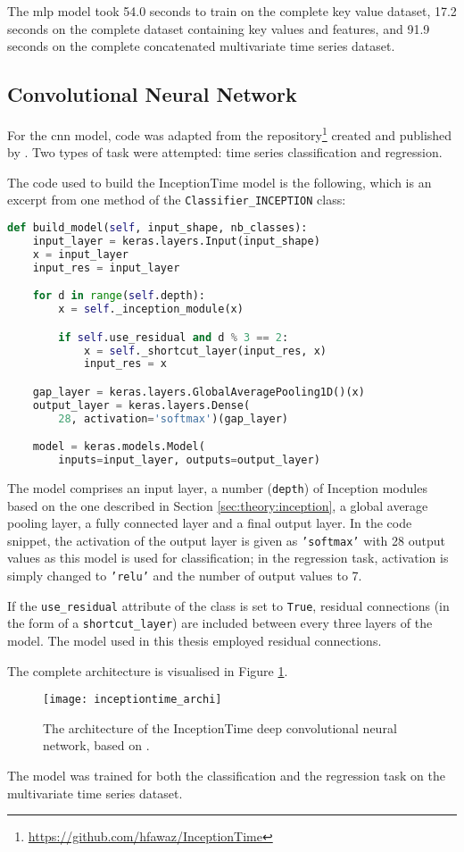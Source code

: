 The \ac{mlp} model took 54.0 seconds to train on the complete key value dataset, 17.2 seconds on the complete dataset containing key values and features, and 91.9 seconds on the complete concatenated multivariate time series dataset.

\subsection{Convolutional Neural Network}
For the \ac{cnn} model, code was adapted from the repository\footnote{\url{https://github.com/hfawaz/InceptionTime}} created and published by \citet[]{fawaz_inceptiontime_2019}. Two types of task were attempted: time series classification and regression.

The code used to build the InceptionTime model is the following, which is an excerpt from one method of the \texttt{Classifier\_INCEPTION} class:

\begin{lstlisting}[language=Python]
def build_model(self, input_shape, nb_classes):
    input_layer = keras.layers.Input(input_shape)
    x = input_layer
    input_res = input_layer

    for d in range(self.depth):
        x = self._inception_module(x)

        if self.use_residual and d % 3 == 2:
            x = self._shortcut_layer(input_res, x)
            input_res = x

    gap_layer = keras.layers.GlobalAveragePooling1D()(x)
    output_layer = keras.layers.Dense(
        28, activation='softmax')(gap_layer)

    model = keras.models.Model(
        inputs=input_layer, outputs=output_layer)
\end{lstlisting}

The model comprises an input layer, a number (\texttt{depth}) of Inception modules based on the one described in Section \ref{sec:theory:inception}, a global average pooling layer, a fully connected layer and a final output layer. In the code snippet, the activation of the output layer is given as \texttt{'softmax'} with 28 output values as this model is used for classification; in the regression task, activation is simply changed to \texttt{'relu'} and the number of output values to 7.

If the \texttt{use\_residual} attribute of the class is set to \texttt{True}, residual connections (in the form of a \texttt{shortcut\_layer}) are included between every three layers of the model. The model used in this thesis employed residual connections.

The complete architecture is visualised in Figure \ref{fig:inceptiontime_archi}.

\begin{figure}[tb!]
    \centering
    \texttt{[image: inceptiontime\_archi]}
    \caption{\label{fig:inceptiontime_archi} The architecture of the InceptionTime deep convolutional neural network, based on \citet{fawaz_inceptiontime_2019}.}
\end{figure}

The model was trained for both the classification and the regression task on the multivariate time series dataset.
